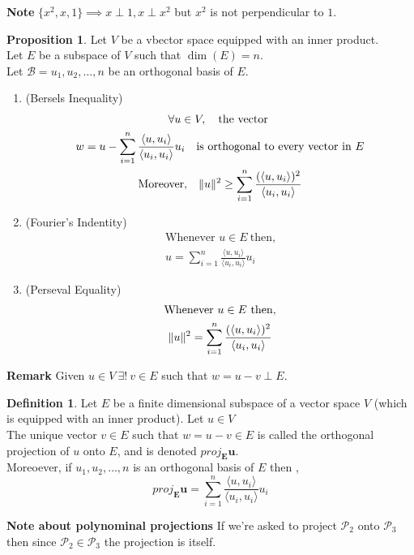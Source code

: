 \documentclass[
12pt,
]{article}
\newcommand{\un}{u_1 , u_2 , \dots , n}
\newcommand{\la}{\langle}
\newcommand{\ra}{\rangle}
\DeclarePairedDelimiter{\norm}{\lVert}{\rVert}
\newcommand{\vectorproj}[2][]{\textit{proj}_{\vect{#1}}\vect{#2}}
\newcommand{\vect}{\mathbf}
\theoremstyle{definition}
\theoremstyle{definition}
\theoremstyle{definition}
\newtheorem{Definition}{Definition}[section]
\theoremstyle{definition}
\newtheorem{Proposition}{Proposition}[section]
\begin{document}
\textbf{Note} $\{x^2,x,1\} \implies x \perp 1 , x \perp x^2 $ but $ x^2$ is not perpendicular to $1$. \\
\begin{Proposition}
	Let $V$ be a vbector space equipped with an inner product. \\
	Let $E$ be a subspace of $V$ such that $\dim(E) =n$. \\
	Let $\mathcal{B} = {\un}$ be an orthogonal basis of $E$.
	\begin{enumerate}
	\item (Bersels Inequality) 
	\begin{gather*}
		\forall u \in V, \quad \text{the vector } \\
		w = u - \sum_{i=1}^{n}\frac{ \la  u,u_i \ra }{ \la  u_i,u_i \ra } u_i \quad \text{is orthogonal to every vector in $E$} \\
		\text{Moreover,} \quad \norm{u}^2 \geq  \sum_{i=1}^{n}\frac{( \la  u,u_i \ra )^2}{ \la  u_i,u_i \ra }
	\end{gather*}
	\item (Fourier's Indentity) 
	\begin{gather*}
		\text{Whenever } u \in E \ \text{then,} \\
		u = \sum_{i=1}^{n}\frac{ \la  u,u_i \ra }{ \la  u_i,u_i \ra } u_i 
	\end{gather*}
	\item (Perseval Equality)
	\begin{gather*}
	\text{Whenever } u \in E \ \text{then,} \\
	\norm{u}^2 = \sum_{i=1}^{n}\frac{( \la  u,u_i \ra )^2}{ \la  u_i,u_i \ra }
	\end{gather*}
	\end{enumerate}
\end{Proposition}
\textbf{Remark} Given $u \in V \ \exists ! \ v\in E$ such that $w = u-v \perp E$.
\begin{Definition}
	Let $E$ be a finite dimensional subspace of a vector space $V$ (which is equipped with an inner product). Let $u \in V$ \\
	The unique vector $v \in E$ such that $w = u -v \in E $ is called the orthogonal projection of $u$ onto $E$, and is denoted  $\vectorproj[E]{u}$. \\
	Moreoever, if ${\un}$ is an orthogonal basis of $E$ then ,
	\begin{equation*}
		\vectorproj[E]{u} = \sum_{i=1}^{n} \frac{ \la  u,u_i \ra }{ \la  u_i,u_i \ra } u_i
	\end{equation*}	
\end{Definition}
\textbf{Note about polynominal projections} If we're asked to project $\mathcal{P}_2$ onto $\mathcal{P}_3$ then since $\mathcal{P}_2 \in \mathcal{P}_3$ the projection is itself. \\
\end{document}
